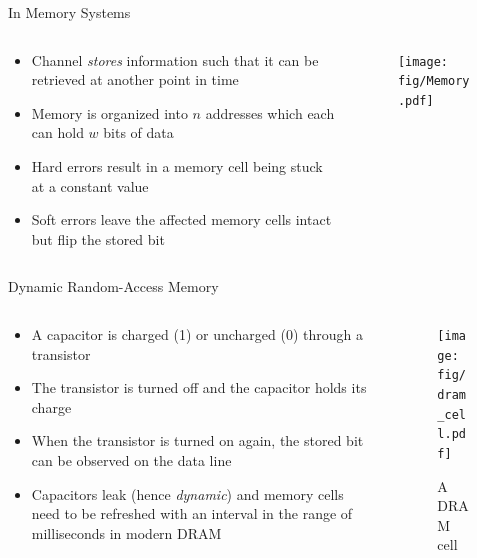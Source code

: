 \documentclass[aspectratio=169,hyperref={pdfpagelabels=false}]{beamer}
\begin{document}
\begin{frame}{In Memory Systems}

    \begin{columns}

        \begin{column}{0.56\textwidth}
            \begin{itemize}
                \item Channel \textit{stores} information such that it can be retrieved at another point in time
                \item Memory is organized into $n$ addresses which each can hold $w$ bits of data 
                \item Hard errors result in a memory cell being stuck at a constant value
                \item Soft errors leave the affected memory cells intact but flip the stored bit
            \end{itemize}
        \end{column}
        
        \begin{column}{0.39\textwidth}
            \begin{figure}
                \texttt{[image: fig/Memory.pdf]}
            \end{figure}
        \end{column}
        

        
    \end{columns}
\end{frame}

\begin{frame}{Dynamic Random-Access Memory}
    
    \begin{columns}
        \begin{column}{0.56\textwidth}
            \begin{itemize}
                \item A capacitor is charged (1) or uncharged (0) through a transistor
                \item The transistor is turned off and the capacitor holds its charge
                \item When the transistor is turned on again, the stored bit can be observed on the data line
                \item Capacitors leak (hence \textit{dynamic}) and memory cells need to be refreshed with an interval in the range of milliseconds in modern DRAM
            \end{itemize}
        \end{column}
        \begin{column}{0.39\textwidth}
            \begin{figure}
                \texttt{[image: fig/dram\_cell.pdf]}
                \caption{A DRAM cell}
            \end{figure}
        \end{column}
    \end{columns}

\end{frame}
\end{document}
